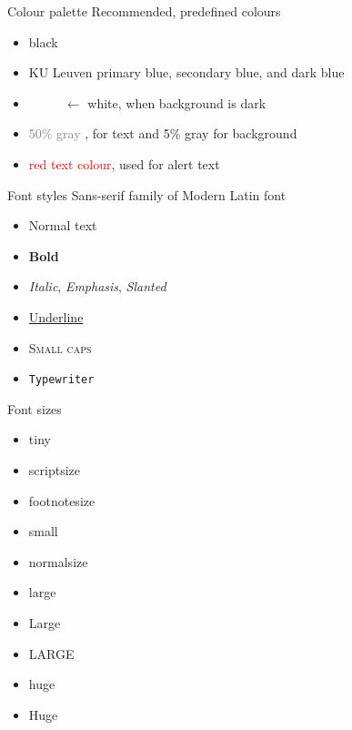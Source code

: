\documentclass[11pt,t]{beamer}
\begin{document}
\begin{frame}{Colour palette}
Recommended, predefined colours
\begin{itemize}
	\item black
	\item \textcolor{kul-blue}{KU Leuven primary blue}, \textcolor{kul-secblue}{secondary blue}, and \textcolor{kul-dark}{dark blue}
	\item \textcolor{white}{white} $\leftarrow$ white, when background is dark
	\item \textcolor{gray}{50\% gray }, for text and \textcolor{lgray}{5\% gray} for background

	\vspace{5mm}
	\item \textcolor{red}{red text colour}, used for \alert{alert text}
\end{itemize}
\end{frame} 




\begin{frame}{Font styles}
Sans-serif family of Modern Latin font
\begin{itemize}
	\item Normal text
	\item \textbf{Bold}
	\item \textit{Italic}, \emph{Emphasis}, \textsl{Slanted}
	\item \underline{Underline}
	\item \textsc{Small caps}
	\item \texttt{Typewriter}
\end{itemize}
\end{frame}




\begin{frame}{Font sizes}
\begin{itemize}
	\item \tiny tiny
	\item \scriptsize scriptsize
	\item \footnotesize footnotesize
	\item \small small
	\item \normalsize normalsize
	\item \large large
	\item \Large Large
	\item \LARGE LARGE
	\item \huge huge
	\item \Huge Huge 
\end{itemize}
\end{frame} 
\end{document}
